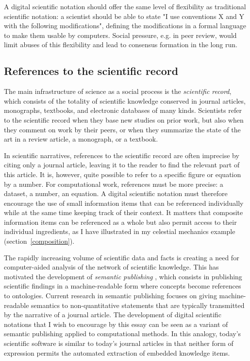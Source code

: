 A digital scientific notation should offer the same level of flexibility as traditional scientific notation: a scientist should be able to state "I use conventions X and Y with the following modifications", defining the modifications in a formal language to make them usable by computers. Social pressure, e.g. in peer review, would limit abuses of this flexibility and lead to consensus formation in the long run.

\subsection{References to the scientific record}
\label{sr-references}

The main infrastructure of science as a social process is the \textit{scientific record}, which consists of the totality of scientific knowledge conserved in journal articles, monographs, textbooks, and electronic databases of many kinds. Scientists refer to the scientific record when they base new studies on prior work, but also when they comment on work by their peers, or when they summarize the state of the art in a review article, a monograph, or a textbook.

In scientific narratives, references to the scientific record are often imprecise by citing only a journal article, leaving it to the reader to find the relevant part of this article. It is, however, quite possible to refer to a specific figure or equation by a number. For computational work, references must be more precise: a dataset, a number, an equation. A digital scientific notation must therefore encourage the use of small information items that can be referenced individually while at the same time keeping track of their context. It matters that composite information items can be referenced as a whole but also permit access to their individual ingredients, as I have illustrated in my celestial mechanics example (section~\ref{composition}).

The rapidly increasing volume of scientific data and facts is creating a need for computer-aided analysis of the network of scientific knowledge. This has motivated the development of \textit{semantic publishing} \cite{shotton_semantic_2009}, which consists in publishing scientific findings in a machine-readable form where concepts become references to ontologies. Current research in semantic publishing focuses on giving machine-readable semantics to non-quantitative statements that are typically transmitted by the narrative of a journal article. The development of digital scientific notations that I wish to encourage by this essay can be seen as a variant of semantic publishing applied to computational methods. In this analogy, today's scientific software is similar to today's journal articles in that neither form of expression permits the automated extraction of embedded knowledge items.

